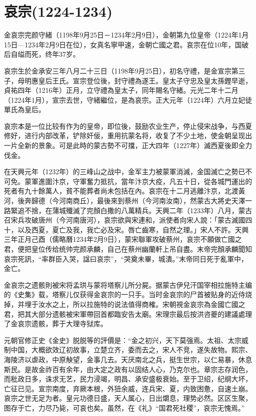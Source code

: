 
\section{哀宗\tiny(1224-1234)}

金哀宗完颜守緒（1198年9月25日－1234年2月9日），金朝第九位皇帝（1224年1月15日—1234年2月9日在位），女真名寧甲速，金朝亡國之君。哀宗在位10年，国破后自缢而死，终年37岁。

哀宗生於金承安三年八月二十三日（1198年9月25日），初名守禮，是金宣宗第三子，母明惠皇后王氏。宣宗登位後，封守禮為遂王。皇太子守忠及皇太孫鏗早逝，貞祐四年（1216年）正月，立守禮為皇太子，同年賜名守緒。元光二年十二月（1224年1月），宣宗去世，守緒繼位，是為哀宗。正大元年（1224年）六月立妃徒單氏為皇后。

哀宗本是一位比较有作为的皇帝，即位後，鼓励农业生产，停止侵宋战争，与西夏修好，进行内部改革，铲除奸佞，重用抗蒙名将，收复了不少土地，使金朝呈现出一片全新的景象。可是此時的蒙古勢不可擋，正大四年（1227年）滅西夏後即全力伐金。

在天興元年（1232年）的三峰山之战中，金军主力被蒙軍消滅，金国滅亡之勢已不可免。蒙軍進圍汴京，守軍奮力抵抗，當年汴京大疫，凡五十日，從各城門運出的死者有九十餘萬人，貧不能葬者尚未包括在內。哀宗在十二月逃離汴京，北渡黃河，後奔歸德（今河南商丘），最後來到蔡州（今河南汝南），然蒙古大將史天澤一路緊追不捨，在蒲城殲滅了完顏白撒的八萬精兵。天興二年（1233年）八月，蒙古召宋兵攻破唐州（今河南唐河），哀宗欲與宋連和，派使者向宋人說：「蒙古滅國四十，以及西夏，夏亡及我，我亡必及宋。唇亡齒寒，自然之理。」宋人不許。天興三年正月己酉（儒略曆1234年2月9日），蒙宋聯軍攻破蔡州，哀宗不願做亡國之君，便把皇位传给统帅完颜承麟，自己在蔡州幽蘭軒上吊自盡。末帝完顏承麟聞知哀宗死訊，“率群臣入哭，諡曰哀宗”，“哭奠未畢，城潰。”末帝同日死于亂軍中，金亡。

金哀宗之遗骸則被宋将孟珙与蒙将塔察儿所分屍。据蒙古伊兒汗国宰相拉施特主编的《史集》载，塔察儿仅获得金哀宗的一只手。当时金哀宗的尸首被贴身的近侍烧掉，并埋于汝水之上，所以拉施特的说法值得商榷。宋朝視金哀宗為金國亡國之君，把其大部分遗骸被宋軍帶回首都臨安告太廟。宋理宗最后按洪咨夔的建議處理了金哀宗遗骸，葬于大理寺狱库。

元朝官修正史《金史》脱脱等的評價是：“金之初兴，天下莫强焉。太祖、太宗威制中国，大概欲效辽初故事，立楚立齐，委而去之，宋人不竞，遂失故物。熙宗、海陵济以虐政，中原觖望，金事几去。天厌南北之兵，挺生世宗，以仁易暴，休息斯民。是故金祚百有余年，由大定之政有以固结人心，乃克尔也。章宗志存润色，而秕政日多，诛求无艺，民力浸竭，明昌、承安盛极衰始。至于卫绍，纪纲大坏，亡征已见。宣宗南度，弃厥本根，外狃余威，连兵宋、夏，内致困惫，自速土崩。哀宗之世无足为者。皇元功德日盛，天人属心，日出爝息，理势必然。区区生聚，图存于亡，力尽乃毙，可哀也矣。虽然，在《礼》“国君死社稷”，哀宗无愧焉。”

